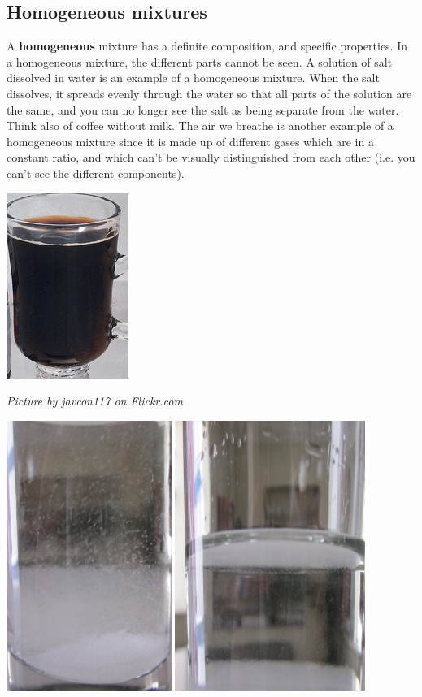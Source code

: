             \subsection*{Homogeneous mixtures}
            \nopagebreak
        \label{m38708*id62762}A \textbf{homogeneous} mixture has a definite composition, and specific properties. In a homogeneous mixture, the different parts cannot be seen. A solution of salt dissolved in water is an example of a homogeneous mixture. When the salt dissolves, it spreads evenly through the water so that all parts of the solution are the same, and you can no longer see the salt as being separate from the water. Think also of coffee without milk. The air we breathe is another example of a homogeneous mixture since it is made up of different gases which are in a constant ratio, and which can't be visually distinguished from each other (i.e. you can't see the different components).\par 
\begin{minipage}{.5\textwidth}
\begin{center}
 \includegraphics[width=.3\textwidth]{photos/mix2by-javcon117-flickr.jpg}\par
\textit{Picture by javcon117 on Flickr.com}
\end{center}
\end{minipage}
\begin{minipage}{.5\textwidth}
\begin{center}
 \includegraphics[width=.5\textwidth]{photos/saltwater.png}\par
\end{center}
\end{minipage}
